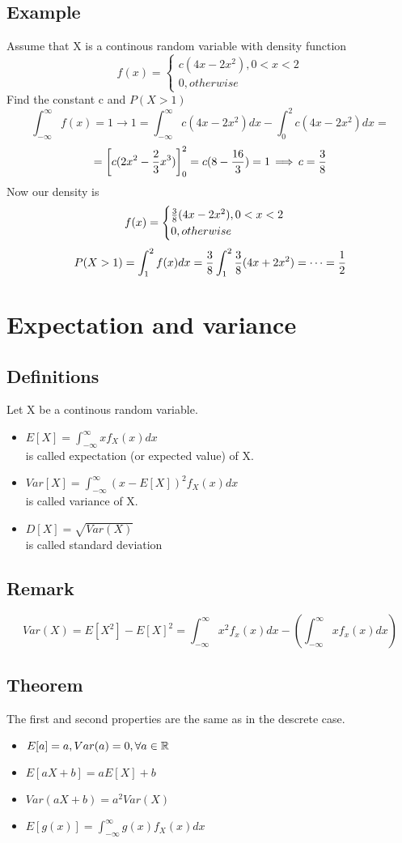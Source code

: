\documentclass{article}
\begin{document}
\subsection{Example}
Assume that X is a continous random variable with density function
$$ f(x) =
  \begin{cases}
    c(4x-2x^2), 0<x<2\\
    0, otherwise
  \end{cases}
$$
Find the constant c and $P(X>1)$
$$ \int^\infty_{-\infty} f(x) = 1 \rightarrow 1 = \int^\infty_{-\infty} c(4x-2x^2)dx-\int^2_0c(4x-2x^2)dx =$$
$$= {\left[ c(2x^2 - \frac{2}{3} x^3) \right]}^2_0 = c(8-\frac{16}{3}) = 1 \operatorname{\implies} c = \frac{3}{8}  $$
Now our density is
$$ f(x) =
  \begin{cases}
    \frac{3}{8}(4x-2x^2), 0<x<2\\
    0, otherwise
  \end{cases}
$$
$$ P(X>1) = \int^2_1 f(x)dx =\frac{3}{8} \int^2_1 \frac{3}{8}(4x+2x^2) =\dots =\frac{1}{2}  $$

\section{Expectation and variance}
\subsection{Definitions}
Let X be a continous random variable.
\begin{itemize}
    \item $ E[X] = \int^{\infty}_{-\infty} xf_X(x)dx $ \\is called expectation (or expected value) of X.
    \item $ Var[X] = \int^{\infty}_{-\infty} (x-E[X])^2f_X(x)dx $ \\is called variance of X.
    \item $ D[X] = \sqrt{Var(X)} $ \\is called standard deviation
\end{itemize}

\subsection{Remark}
$$ Var(X) = E[X^2] - E[X]^2 = \int^\infty_{-\infty} x^2 f_x(x) dx - {\left( \int^\infty_{-\infty} xf_x(x)dx \right)}  $$

\subsection{Theorem}
The first and second properties are the same as in the descrete case.
\begin{itemize}
  \item $ E[a] = a, Var(a) = 0, \forall a \in {\mathbb R} $
  \item $ E[aX+b] = aE[X]+b$
  \item $Var(aX+b) = a^2Var(X)$
  \item $E[g(x)] = \int^\infty_{-\infty} g(x)f_X(x)dx$
\end{itemize}
\end{document}
